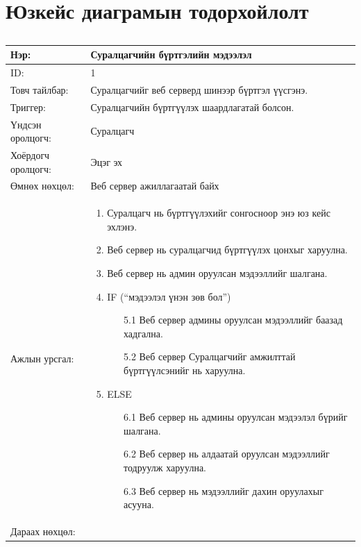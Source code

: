 \section{Юзкейс диаграмын тодорхойлолт}
\begin{center}
	\begin{table}[!htbp]
		\caption{}
		\begin{tabular}{|p{4cm}|p{11cm}|}
		\hline
			Нэр: & Суралцагчийн бүртгэлийн мэдээлэл \\
		\hline
			ID: & 1 \\
		\hline
			Товч тайлбар: & Суралцагчийг веб серверд шинээр бүртгэл үүсгэнэ. \\
		\hline
			Триггер: & Суралцагчийн бүртгүүлэх шаардлагатай болсон. \\
		\hline
			Үндсэн оролцогч: & Суралцагч \\
		\hline
			Хоёрдогч оролцогч: & Эцэг эх  \\
		\hline
			Өмнөх нөхцөл: &  Веб сервер ажиллагаатай байх\\
		\hline
			Ажлын урсгал: & \begin{enumerate}
						 	\item Суралцагч нь бүртгүүлэхийг сонгосноор энэ юз кейс эхлэнэ. 
						 	\item Веб сервер нь суралцагчид бүртгүүлэх цонхыг харуулна.  
						 	\item Веб сервер нь админ оруулсан мэдээллийг шалгана. 
						 	\item IF (“мэдээлэл үнэн зөв бол”)
							 	\begin{enumerate}
							 		\item[5.1] Веб сервер админы оруулсан мэдээллийг баазад хадгална.
							 		\item[5.2] Веб сервер Суралцагчийг амжилттай бүртгүүлсэнийг нь харуулна. 
							 	\end{enumerate}
						 	\item ELSE
							 	\begin{enumerate}
							 		\item[6.1] Веб сервер нь админы оруулсан мэдээлэл бүрийг шалгана.  
							 		\item[6.2] Веб сервер нь алдаатай оруулсан мэдээллийг тодруулж харуулна. 
							 		\item[6.3] Веб сервер нь мэдээллийг дахин оруулахыг асууна. 
							 	\end{enumerate}
						  \end{enumerate}
\\					  \hline
				Дараах нөхцөл: &

\end{tabular}
\end{table}
\end{center}
